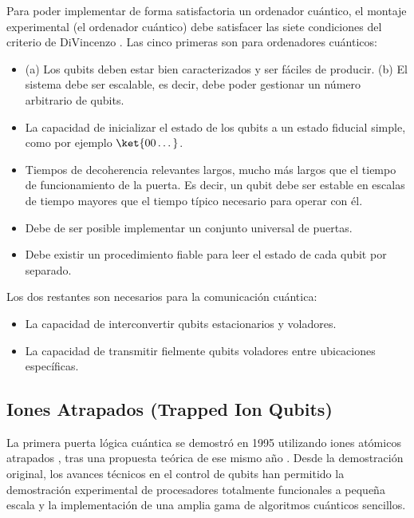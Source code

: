 Para poder implementar de forma satisfactoria un ordenador cuántico, el montaje experimental (el ordenador cuántico) debe satisfacer las siete condiciones del criterio de DiVincenzo \cite{bib_DiVincenzo_2000}. Las cinco primeras son para ordenadores cuánticos:    
\begin{itemize}
\item (a) Los qubits deben estar bien caracterizados y ser fáciles de producir. (b) El sistema debe ser escalable, es decir, debe poder gestionar un número arbitrario de qubits.

\item La capacidad de inicializar el estado de los qubits a un estado fiducial simple, como por ejemplo $\ket{00\dots}$.

\item Tiempos de decoherencia relevantes largos, mucho más largos que el tiempo de funcionamiento de la puerta. Es decir, un qubit debe ser estable en escalas de tiempo mayores que el tiempo típico necesario para operar con él.

\item Debe de ser posible implementar un conjunto universal de puertas.
\item Debe existir un procedimiento fiable para leer el estado de cada qubit por separado.
\end{itemize}

Los dos restantes son necesarios para la comunicación cuántica:
\begin{itemize}
	\item La capacidad de interconvertir qubits estacionarios y voladores.
	\item La capacidad de transmitir fielmente qubits voladores entre ubicaciones específicas.
\end{itemize}
    
    
	
	\subsection{Iones Atrapados (Trapped Ion Qubits)}


La primera puerta lógica cuántica se demostró en 1995 utilizando iones atómicos atrapados \cite{bib_PhysRevLett.75.4714}, tras una propuesta teórica de ese mismo año \cite{bib_PhysRevLett.74.4091}. Desde la demostración original, los avances técnicos en el control de qubits han permitido la demostración experimental de procesadores totalmente funcionales a pequeña escala y la implementación de una amplia gama de algoritmos cuánticos sencillos.

